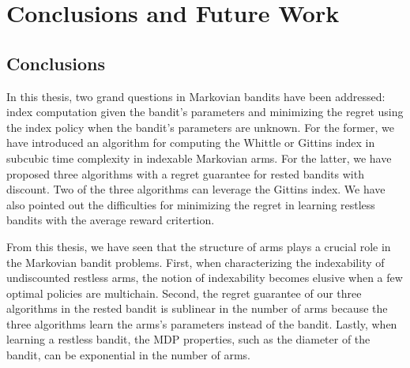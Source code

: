 \begingroup

\let\clearpage\relax

\chapter{Conclusions and Future Work}
\label{chapter:conclusion}


\section{Conclusions}

In this thesis, two grand questions in Markovian bandits have been addressed: index computation given the bandit's parameters and minimizing the regret using the index policy when the bandit's parameters are unknown.
For the former, we have introduced an algorithm for computing the Whittle or Gittins index in subcubic time complexity in indexable Markovian arms. 
For the latter, we have proposed three algorithms with a regret guarantee for rested bandits with discount.
Two of the three algorithms can leverage the Gittins index.
We have also pointed out the difficulties for minimizing the regret in learning restless bandits with the average reward critertion.

From this thesis, we have seen that the structure of arms plays a crucial role in the Markovian bandit problems.
First, when characterizing the indexability of undiscounted restless arms, the notion of indexability becomes elusive when a few optimal policies are multichain.
Second, the regret guarantee of our three algorithms in the rested bandit is sublinear in the number of arms because the three algorithms learn the arms's parameters instead of the bandit.
Lastly, when learning a restless bandit, the MDP properties, such as the diameter of the bandit, can be exponential in the number of arms.

